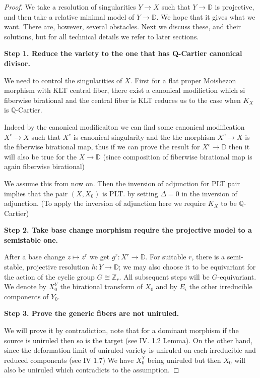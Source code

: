 \documentclass[11pt]{article}
\theoremstyle{definition}
\begin{document}
	\begin{proof}
		We take a resolution of singularities $Y \rightarrow X$ such that $Y \rightarrow \mathbb{D}$ is projective, and then take a relative minimal model of $Y \rightarrow \mathbb{D}$. We hope that it gives what we want. There are, however, several obstacles. Next we discuss these, and their solutions, but for all technical details we refer to later sections.
		
		\textbf{Step 1. Reduce the variety to the one that has Q-Cartier canonical divisor.}
		
		We need to control the singularities of $X$. First for a flat proper Moishezon morphism with KLT central fiber, there exist a canonical modifiction which si fiberwise birational and the central fiber is KLT reduces us to the case when $K_X$ is $\mathbb{Q}$-Cartier. 
		
		Indeed by the canonical modificaiton we can find some canonical modification $X^c \to X$ such that $X^c$ is canonical singularity and the the morphism $X^c\to X$ is the fiberwise birational map, thus if we can prove the result for $X^c \to \mathbb{D}$ then it will also be true for the $X\to \mathbb{D}$ (since composition of fiberwise birational map is again fiberwise birational) 
		
		We assume this from now on. Then the inversion of adjunction for PLT pair implies that the pair $\left(X, X_0\right)$ is PLT. by setting $\Delta = 0$ in the inversion of adjunction. (To apply the inversion of adjunction here we require $K_X$ to be $\mathbb{Q}$-Cartier)
		
		
		\textbf{Step 2. Take base change morphism require the projective model to a semistable one.}
		
		After a base change $z \mapsto z^r$ we get $g^r: X^r \rightarrow \mathbb{D}$. For suitable $r$, there is a semi-stable, projective resolution $h: Y \rightarrow \mathbb{D}$; we may also choose it to be equivariant for the action of the cyclic group $G \cong \mathbb{Z}_r$. All subsequent steps will be $G$-equivariant. We denote by $X_0^Y$ the birational transform of $X_0$ and by $E_i$ the other irreducible components of $Y_0$.
		
		\textbf{Step 3. Prove the generic fibers are not uniruled.}
		
		We will prove it by contradiction, note that for a dominant morphism if the source is uniruled then so is the target (see \cite{Rationalcurve} IV. 1.2 Lemma). On the other hand, since the deformation limit of uniruled variety is uniruled on each irreducible and reduced components (see \cite{Rationalcurve} IV 1.7) We have $X_0^Y$ being uniruled but then $X_0$ will also be uniruled which contradicts to the assumption.
		

\end{proof}
\end{document}

